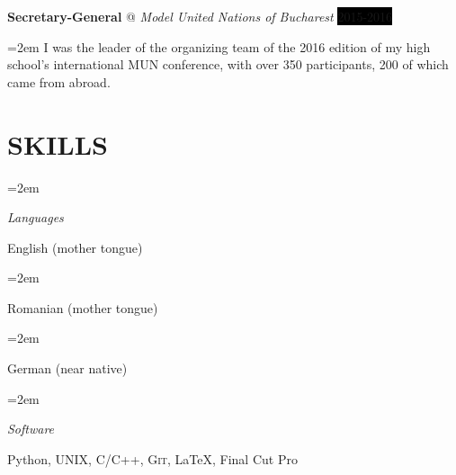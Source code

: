 \documentclass[paper=a4,fontsize=11pt]{scrartcl}
\makeatletter
\newlength{\spacebox}
\newcommand{\NewPart}[1]{\section*{\uppercase{#1}}}
\newcommand{\PersonalEntry}[2]{
		\noindent\hangindent=2em\hangafter=0 %
		\parbox{\spacebox}{        %
		\textit{#1}}		       %
		\hspace{1.5em} #2 \par}    %
\newcommand{\SkillsEntry}[2]{      %
		\noindent\hangindent=2em\hangafter=0 %
		\parbox{\spacebox}{        %
		\textit{#1}}			   %
		\hspace{1.5em} #2 \par}    %
\newcommand{\EducationEntry}[4]{
		\noindent \textbf{#1} \hfill      %
		\colorbox{Black}{%
			\parbox{6em}{%
			\hfill\color{White}#2}} \par  %
		\noindent \textit{#3} \par        %
		\noindent\hangindent=2em\hangafter=0 \small #4 %
		\normalsize \par}
\newcommand{\WorkEntry}[4]{				  %
		\noindent \textbf{#1} @ \textit{#3} \hfill      %
		\colorbox{Black}{\color{White}#2} \par  %
		\noindent\hangindent=2em\hangafter=0 \small #4 %
		\normalsize \par}
\makeatother
\begin{document}
\WorkEntry{Secretary-General}{2015-2016}{Model United Nations of Bucharest}{ I was the leader of the organizing team of the 2016 edition of my high school’s international MUN conference, with over 350 participants, 200 of which came from abroad.}

\NewPart{Skills}{}

\SkillsEntry{Languages}{English (mother tongue)}
\SkillsEntry{}{Romanian (mother tongue)}
\SkillsEntry{}{German (near native)}

\SkillsEntry{Software}{Python, \textsc{UNIX}, \textsc{C/C++}, \textsc{Git}, \LaTeX, Final Cut Pro}


\end{document}
